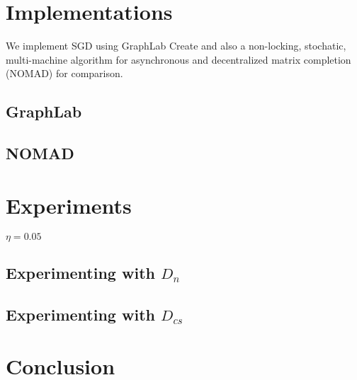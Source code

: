 \documentclass{article} %
\begin{document}
	\section{Implementations}
	We implement SGD using GraphLab Create and also a non-locking, stochatic, multi-machine algorithm for asynchronous and decentralized matrix completion (NOMAD) \cite{yun2013nomad} for comparison.
	\subsection{GraphLab}
	\subsection{NOMAD}
	\section{Experiments}
	
	$\eta=0.05$
	
	\subsection{Experimenting with $D_n$}
	
	\subsection{Experimenting with $D_{cs}$}
	
	
	\section{Conclusion}
	
	
	
	{}
\end{document}

